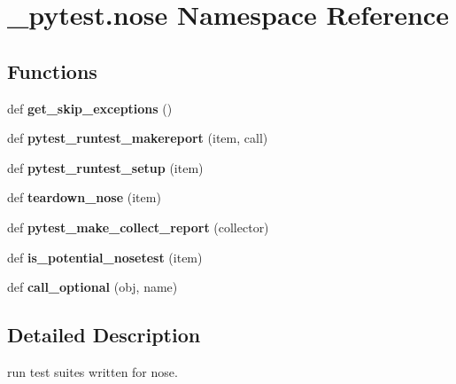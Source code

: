 \hypertarget{namespace__pytest_1_1nose}{}\section{\+\_\+pytest.\+nose Namespace Reference}
\label{namespace__pytest_1_1nose}
\subsection*{Functions}
\begin{DoxyCompactItemize}
\item 
\mbox{\label{namespace__pytest_1_1nose_a319091c3bd6dff5dbf583a34b7c56713}} 
def {\bfseries get\+\_\+skip\+\_\+exceptions} ()
\item 
\mbox{\label{namespace__pytest_1_1nose_abf91f880b6bf463df2631934742a6513}} 
def {\bfseries pytest\+\_\+runtest\+\_\+makereport} (item, call)
\item 
\mbox{\label{namespace__pytest_1_1nose_ae3da928cbd38a7f517bb87e0a9e6b5b2}} 
def {\bfseries pytest\+\_\+runtest\+\_\+setup} (item)
\item 
\mbox{\label{namespace__pytest_1_1nose_ab1a343427e0721e7b24ed26e46ee8404}} 
def {\bfseries teardown\+\_\+nose} (item)
\item 
\mbox{\label{namespace__pytest_1_1nose_a533195b431e90ef2fd120b4aad9d7e02}} 
def {\bfseries pytest\+\_\+make\+\_\+collect\+\_\+report} (collector)
\item 
\mbox{\label{namespace__pytest_1_1nose_a9b9e1106375eedfb6f5fc9878060a282}} 
def {\bfseries is\+\_\+potential\+\_\+nosetest} (item)
\item 
\mbox{\label{namespace__pytest_1_1nose_a176bbfff177cda5edd7601123d3f6325}} 
def {\bfseries call\+\_\+optional} (obj, name)
\end{DoxyCompactItemize}


\subsection{Detailed Description}
\begin{DoxyVerb}run test suites written for nose. \end{DoxyVerb}
 